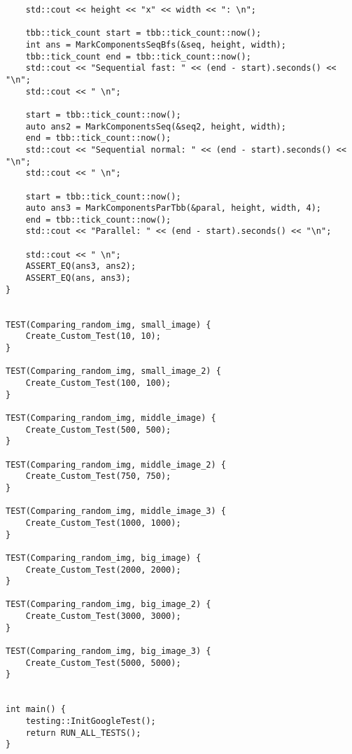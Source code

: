 \documentclass{report}
\begin{document}
\begin{lstlisting}
    std::cout << height << "x" << width << ": \n";

    tbb::tick_count start = tbb::tick_count::now();
    int ans = MarkComponentsSeqBfs(&seq, height, width);
    tbb::tick_count end = tbb::tick_count::now();
    std::cout << "Sequential fast: " << (end - start).seconds() << "\n";
    std::cout << " \n";

    start = tbb::tick_count::now();
    auto ans2 = MarkComponentsSeq(&seq2, height, width);
    end = tbb::tick_count::now();
    std::cout << "Sequential normal: " << (end - start).seconds() << "\n";
    std::cout << " \n";

    start = tbb::tick_count::now();
    auto ans3 = MarkComponentsParTbb(&paral, height, width, 4);
    end = tbb::tick_count::now();
    std::cout << "Parallel: " << (end - start).seconds() << "\n";

    std::cout << " \n";
    ASSERT_EQ(ans3, ans2);
    ASSERT_EQ(ans, ans3);
}


TEST(Comparing_random_img, small_image) {
    Create_Custom_Test(10, 10);
}

TEST(Comparing_random_img, small_image_2) {
    Create_Custom_Test(100, 100);
}

TEST(Comparing_random_img, middle_image) {
    Create_Custom_Test(500, 500);
}

TEST(Comparing_random_img, middle_image_2) {
    Create_Custom_Test(750, 750);
}

TEST(Comparing_random_img, middle_image_3) {
    Create_Custom_Test(1000, 1000);
}

TEST(Comparing_random_img, big_image) {
    Create_Custom_Test(2000, 2000);
}

TEST(Comparing_random_img, big_image_2) {
    Create_Custom_Test(3000, 3000);
}

TEST(Comparing_random_img, big_image_3) {
    Create_Custom_Test(5000, 5000);
}


int main() {
    testing::InitGoogleTest();
    return RUN_ALL_TESTS();
}
\end{lstlisting}
\end{document}
